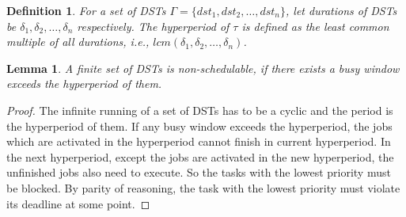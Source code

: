 \documentclass[10pt,conference]{IEEEtran}
\newtheorem{definition}{Definition}
\newtheorem{lemma}{Lemma}
\begin{document}
\begin{definition}
For a set of DSTs $\Gamma=\{dst_1,dst_2,\dots,dst_n\}$, let durations of DSTs be $\delta_1,\delta_2,\dots,\delta_n$ respectively. The hyperperiod of $\tau$ is defined as the least common multiple of all durations, i.e., $lcm(\delta_1,\delta_2,\dots,\delta_n)$.
\end{definition}

\begin{lemma}
  A finite set of DSTs is non-schedulable, if there exists a busy window exceeds the hyperperiod of them.
\end{lemma}\label{lemma_hyperperiod}
\begin{proof}
  The infinite running of a set of DSTs has to be a cyclic and the period is the hyperperiod of them. If any busy window exceeds the hyperperiod, the jobs which are activated in the hyperperiod cannot finish in current hyperperiod. In the next hyperperiod, except the jobs are activated in the new hyperperiod, the unfinished jobs also need to execute. So the tasks with the lowest priority must be blocked. By parity of reasoning, the task with the lowest priority must violate its deadline at some point.
\end{proof}


\end{document}
